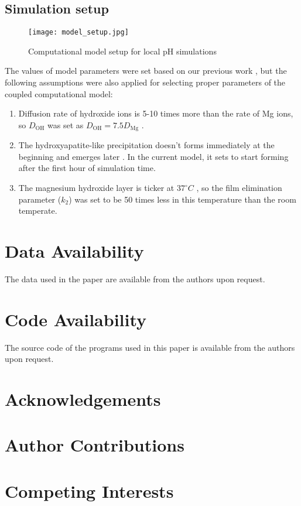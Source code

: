 \subsection{Simulation setup}



\begin{figure}[h]
\centering
\medskip
\texttt{[image: model\_setup.jpg]}
\caption[Computational model setup for local pH simulations]{Computational model setup for local pH simulations} \label{fig:kinetics_model_setup}
\end{figure}

The values of model parameters were set based on our previous work \cite{Barzegari2021}, but the following assumptions were also applied for selecting proper parameters of the coupled computational model:
\begin{enumerate}
\item
Diffusion rate of hydroxide ions is 5-10 times more than the rate of Mg ions, so $D_{\mathrm{OH}}$ was set as $D_{\mathrm{OH}} = 7.5 D_{\mathrm{Mg}}$ \cite{Gonzalez2021}.
\item
The hydroxyapatite-like precipitation doesn't forms immediately at the beginning and emerges later \cite{Gonzalez2021,Wang2022}. In the current model, it sets to start forming after the first hour of simulation time.
\item
The magnesium hydroxide layer is ticker at $37^{\circ}C$ \cite{Wang2022}, so the film elimination parameter ($k_2$) was set to be 50 times less in this temperature than the room temperate.
\end{enumerate}


\section{Data Availability}

The data used in the paper are available from the authors upon request.

\section{Code Availability}
The source code of the programs used in this paper is available from the authors upon request.


\section{Acknowledgements}

\section{Author Contributions}

\section{Competing Interests}


\cleardoublepage
